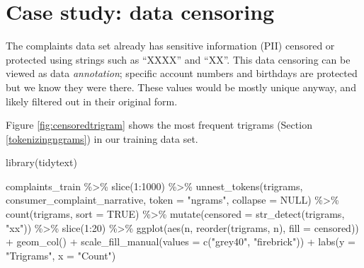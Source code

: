 \documentclass[
]{krantz}
\makeatletter
\newenvironment{Shaded}{\begin{snugshade}}{\end{snugshade}}
\newcommand{\AttributeTok}[1]{\textcolor[rgb]{0.77,0.63,0.00}{#1}}
\newcommand{\ConstantTok}[1]{\textcolor[rgb]{0.00,0.00,0.00}{#1}}
\newcommand{\DecValTok}[1]{\textcolor[rgb]{0.00,0.00,0.81}{#1}}
\newcommand{\FunctionTok}[1]{\textcolor[rgb]{0.00,0.00,0.00}{#1}}
\newcommand{\NormalTok}[1]{#1}
\newcommand{\SpecialCharTok}[1]{\textcolor[rgb]{0.00,0.00,0.00}{#1}}
\newcommand{\StringTok}[1]{\textcolor[rgb]{0.31,0.60,0.02}{#1}}
\newenvironment{kframe}{%
\medskip{}
\setlength{\fboxsep}{.8em}
 \def\at@end@of@kframe{}%
 \ifinner\ifhmode%
  \def\at@end@of@kframe{\end{minipage}}%
  \begin{minipage}{\columnwidth}%
 \fi\fi%
 \def\FrameCommand##1{\hskip\@totalleftmargin \hskip-\fboxsep
 \colorbox{shadecolor}{##1}\hskip-\fboxsep
     \hskip-\linewidth \hskip-\@totalleftmargin \hskip\columnwidth}%
 \MakeFramed {\advance\hsize-\width
   \@totalleftmargin\z@ \linewidth\hsize
   \@setminipage}}%
 {\par\unskip\endMakeFramed%
 \at@end@of@kframe}
\renewenvironment{Shaded}{\begin{kframe}}{\end{kframe}}
\makeatother
\begin{document}
\hypertarget{case-study-data-censoring}{%
\section{Case study: data censoring}\label{case-study-data-censoring}}

The complaints data set already has sensitive information (PII) censored or protected using strings such as ``XXXX'' and ``XX''.
This data censoring can be viewed as data \emph{annotation}; specific account numbers and birthdays are protected but we know they were there. These values would be mostly unique anyway, and likely filtered out in their original form.

Figure \ref{fig:censoredtrigram} shows the most frequent trigrams (Section \ref{tokenizingngrams}) in our training data set.

\begin{Shaded}
\begin{Highlighting}[]
\FunctionTok{library}\NormalTok{(tidytext)}

\NormalTok{complaints\_train }\SpecialCharTok{\%\textgreater{}\%}
  \FunctionTok{slice}\NormalTok{(}\DecValTok{1}\SpecialCharTok{:}\DecValTok{1000}\NormalTok{) }\SpecialCharTok{\%\textgreater{}\%}
  \FunctionTok{unnest\_tokens}\NormalTok{(trigrams, }
\NormalTok{                consumer\_complaint\_narrative, }\AttributeTok{token =} \StringTok{"ngrams"}\NormalTok{,}
                \AttributeTok{collapse =} \ConstantTok{NULL}\NormalTok{) }\SpecialCharTok{\%\textgreater{}\%}
  \FunctionTok{count}\NormalTok{(trigrams, }\AttributeTok{sort =} \ConstantTok{TRUE}\NormalTok{) }\SpecialCharTok{\%\textgreater{}\%}
  \FunctionTok{mutate}\NormalTok{(}\AttributeTok{censored =} \FunctionTok{str\_detect}\NormalTok{(trigrams, }\StringTok{"xx"}\NormalTok{)) }\SpecialCharTok{\%\textgreater{}\%}
  \FunctionTok{slice}\NormalTok{(}\DecValTok{1}\SpecialCharTok{:}\DecValTok{20}\NormalTok{) }\SpecialCharTok{\%\textgreater{}\%}
  \FunctionTok{ggplot}\NormalTok{(}\FunctionTok{aes}\NormalTok{(n, }\FunctionTok{reorder}\NormalTok{(trigrams, n), }\AttributeTok{fill =}\NormalTok{ censored)) }\SpecialCharTok{+}
  \FunctionTok{geom\_col}\NormalTok{() }\SpecialCharTok{+}
  \FunctionTok{scale\_fill\_manual}\NormalTok{(}\AttributeTok{values =} \FunctionTok{c}\NormalTok{(}\StringTok{"grey40"}\NormalTok{, }\StringTok{"firebrick"}\NormalTok{)) }\SpecialCharTok{+}
  \FunctionTok{labs}\NormalTok{(}\AttributeTok{y =} \StringTok{"Trigrams"}\NormalTok{, }\AttributeTok{x =} \StringTok{"Count"}\NormalTok{)}
\end{Highlighting}
\end{Shaded}
\end{document}
